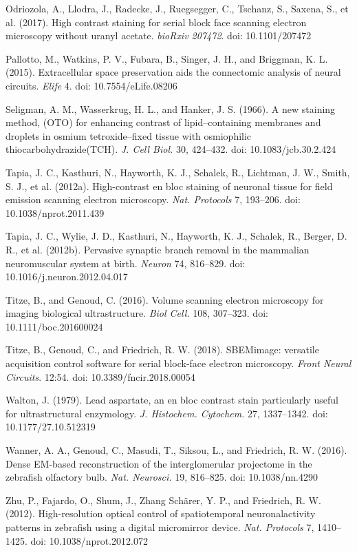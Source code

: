 \documentclass{article}
\newenvironment{reflist}{\par\small\setlength{\parindent}{0pt}\everypar{\hangindent=2.2em\hangafter=1\relax}}{\par}
\begin{document}
\begin{reflist}
Odriozola, A., Llodra, J., Radecke, J., Ruegsegger, C., Tschanz, S., Saxena, S., et al. (2017). High contrast staining for serial block face scanning electron microscopy without uranyl acetate. \emph{bioRxiv 207472}. doi: 10.1101/207472

Pallotto, M., Watkins, P. V., Fubara, B., Singer, J. H., and Briggman, K. L. (2015). Extracellular space preservation aids the connectomic analysis of neural circuits. \emph{Elife} 4. doi: 10.7554/eLife.08206

Seligman, A. M., Wasserkrug, H. L., and Hanker, J. S. (1966). A new staining method, (OTO) for enhancing contrast of lipid–containing membranes and droplets in osmium tetroxide–fixed tissue with osmiophilic thiocarbohydrazide(TCH). \emph{J. Cell Biol.} 30, 424–432. doi: 10.1083/jcb.30.2.424

Tapia, J. C., Kasthuri, N., Hayworth, K. J., Schalek, R., Lichtman, J. W., Smith, S. J., et al. (2012a). High-contrast en bloc staining of neuronal tissue for field emission scanning electron microscopy. \emph{Nat. Protocols} 7, 193–206. doi: 10.1038/nprot.2011.439

Tapia, J. C., Wylie, J. D., Kasthuri, N., Hayworth, K. J., Schalek, R., Berger, D. R., et al. (2012b). Pervasive synaptic branch removal in the mammalian neuromuscular system at birth. \emph{Neuron} 74, 816–829. doi: 10.1016/j.neuron.2012.04.017

Titze, B., and Genoud, C. (2016). Volume scanning electron microscopy for imaging biological ultrastructure. \emph{Biol Cell.} 108, 307–323. doi: 10.1111/boc.201600024

Titze, B., Genoud, C., and Friedrich, R. W. (2018). SBEMimage: versatile acquisition control software for serial block-face electron microscopy. \emph{Front Neural Circuits}. 12:54. doi: 10.3389/fncir.2018.00054

Walton, J. (1979). Lead aspartate, an en bloc contrast stain particularly useful for ultrastructural enzymology. \emph{J. Histochem. Cytochem.} 27, 1337–1342. doi: 10.1177/27.10.512319

Wanner, A. A., Genoud, C., Masudi, T., Siksou, L., and Friedrich, R. W. (2016). Dense EM-based reconstruction of the interglomerular projectome in the zebrafish olfactory bulb. \emph{Nat. Neurosci.} 19, 816–825. doi: 10.1038/nn.4290

Zhu, P., Fajardo, O., Shum, J., Zhang Schärer, Y. P., and Friedrich, R. W. (2012). High-resolution optical control of spatiotemporal neuronalactivity patterns in zebrafish using a digital micromirror device. \emph{Nat. Protocols} 7, 1410–1425. doi: 10.1038/nprot.2012.072
\end{reflist}
\end{document}
